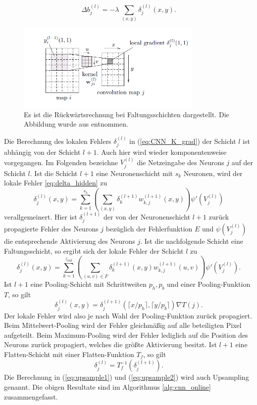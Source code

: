 \begin{equation*}
    \Delta b_j^{(l)}= -\lambda \, \sum_{(x,y)} \delta_j^{(l)}(x,y).
\end{equation*}

\begin{figure}[h]
    \includegraphics[width=0.8\textwidth]{pics/chapters/CCN/backprop_dudiss.png}
    \centering
    \caption{Es ist die Rückwärtsrechnung bei Faltungsschichten dargestellt. Die Abbildung wurde aus \cite{du_diss} entnommen.}
    \label{abb:error_conv}
\end{figure}
Die Berechnung des lokalen Fehlers $\delta_{j}^{(l)}$ in (\ref{eq:CNN_K_grad}) der Schicht $l$ ist abhängig von der Schicht $l+1$. Auch hier wird wieder komponentenweise vorgegangen. Im Folgenden bezeichne $V_j^{(l)}$ die Netzeingabe des Neurons $j$ auf der Schicht $l$.
Ist die Schicht $l+1$ eine Neuronenschicht mit $s_k$ Neuronen, wird der lokale Fehler \ref{eq:delta_hidden} zu
\begin{equation*}
    \delta_j^{(l)}(x,y)=\sum_{k=1}^{s_{k}} \left(\sum_{(x,y)} \delta_k^{(l+1)} w_{k,j}^{(l+1)}(x,y)\right) \psi'(V_j^{(l)})
\end{equation*}
verallgemeinert. 
Hier ist $\delta_j^{(l+1)}$ der von der Neuronenschicht $l+1$ zurück propagierte Fehler des Neurons $j$ bezüglich der Fehlerfunktion $E$ und $\psi(V^{(l)}_j)$ die entsprechende Aktivierung des Neurons $j$.
Ist die nachfolgende Schicht eine Faltungsschicht, so ergibt sich der lokale Fehler der Schicht $l$ zu
\begin{equation*}
    \delta_j^{(l)}(x,y)=\sum_{k=1}^{z_{out}} \left(\sum_{(u,v) \in F} \delta_k^{(l+1)}(x,y) w_{k,j}^{(l+1)}(u,v)\right) \psi'(V_j^{(l)}).
\end{equation*}
Ist $l+1$ eine Pooling-Schicht mit Schrittweiten $p_h,p_b$ und einer Pooling-Funktion $T$, so gilt
\begin{equation}
    \label{eq:upsample1}
    \delta_j^{(l)}(x,y)=\delta_j^{(l+1)}(\lceil x/p_h \rceil ,\lceil y/p_b \rceil)\nabla T(j).
\end{equation}
Der lokale Fehler wird also je nach Wahl der Pooling-Funktion zurück propagiert. Beim Mittelwert-Pooling wird der Fehler gleichmäßig auf alle beteiligten Pixel aufgeteilt. Beim Maximum-Pooling wird der Fehler lediglich auf die Position des Neurons zurück propagiert, welches die größte Aktivierung besitzt. 
Ist $l+1$ eine Flatten-Schicht mit einer Flatten-Funktion $T_f$, so gilt
\begin{equation}
    \label{eq:upsample2}
    \delta_j^{(l)}=T^{-1}_f(\delta_j^{(l+1)}).
\end{equation}
Die Berechnung in (\ref{eq:upsample1}) und (\ref{eq:upsample2}) wird auch Upsampling genannt. Die obigen Resultate sind im Algorithmus \ref{alg:cnn_online} zusammengefasst.

